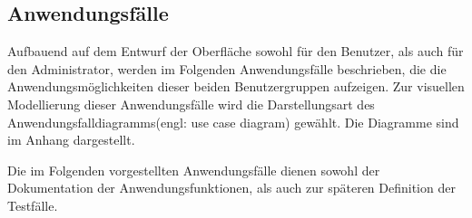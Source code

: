 \subsection{Anwendungsfälle}
\label{sec:Anwendungsfaelle}


Aufbauend auf dem Entwurf der Oberfläche sowohl für den Benutzer, als auch für den Administrator, werden im Folgenden Anwendungsfälle beschrieben, die die Anwendungsmöglichkeiten dieser beiden Benutzergruppen aufzeigen. Zur visuellen Modellierung dieser Anwendungsfälle wird die Darstellungsart des Anwendungsfalldiagramms\footnotemark (engl: use case diagram) gewählt. Die Diagramme sind im Anhang dargestellt.


Die im Folgenden vorgestellten Anwendungsfälle dienen sowohl der Dokumentation der Anwendungsfunktionen, als auch zur späteren Definition der Testfälle.